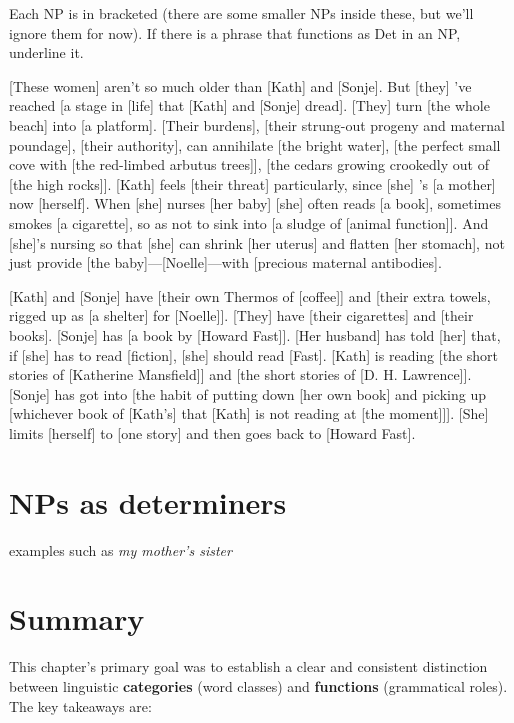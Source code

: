 \begin{tcolorbox}[title=From ``The love of a good woman'' by Alice Munro, colback=white]

Each NP is in bracketed (there are some smaller NPs inside these, but we'll ignore them for now). If there is a phrase that functions as Det in an NP, underline it.

\phantom{a}

    [These women] aren't so much older than [Kath] and [Sonje]. But [they] 've reached [a stage in [life] that [Kath] and [Sonje] dread]. [They] turn [the whole beach] into [a platform]. [Their burdens], [their strung-out progeny and maternal poundage], [their authority], can annihilate [the bright water], [the perfect small cove with [the red-limbed arbutus trees]], [the cedars growing crookedly out of [the high rocks]]. [Kath] feels [their threat] particularly, since [she] 's [a mother] now [herself]. When [she] nurses [her baby] [she] often reads [a book], sometimes smokes [a cigarette], so as not to sink into [a sludge of [animal function]]. And [she]'s nursing so that [she] can shrink [her uterus] and flatten [her stomach], not just provide [the baby]---[Noelle]---with [precious maternal antibodies].

    \phantom{xxx}[Kath] and [Sonje] have [their own Thermos of [coffee]] and [their extra towels, rigged up as [a shelter] for [Noelle]]. [They] have [their cigarettes] and [their books]. [Sonje] has [a book by [Howard Fast]]. [Her husband] has told [her] that, if [she] has to read [fiction], [she] should read [Fast]. [Kath] is reading [the short stories of [Katherine Mansfield]] and [the short stories of [D. H. Lawrence]]. [Sonje] has got into [the habit of putting down [her own book] and picking up [whichever book of [Kath's] that [Kath] is not reading at [the moment]]]. [She] limits [herself] to [one story] and then goes back to [Howard Fast].
\end{tcolorbox}

\section{NPs as determiners}

examples such as \textit{my mother's sister}

\section*{Summary}

This chapter's primary goal was to establish a clear and consistent distinction between linguistic \textbf{categories} (word classes) and \textbf{functions} (grammatical roles). The key takeaways are:

